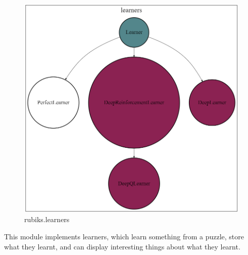 \label{sec:codelearners}
\begin{figure}[H]
\centering
\includegraphics[scale=0.22]{./Figures/codebaselearners}
\caption[Codebase]{rubiks.learners}
\label{fig:Codebaselearners}
\end{figure}
\label{PLcode}
\label{DRLcode}
\label{DQLcode}
This module implements learners, which learn something from a puzzle, store what they learnt, and can display interesting things about what they learnt.

